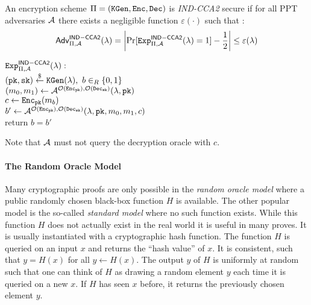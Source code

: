 \begin{definition}\label{def:indcca2}
An encryption scheme $\Pi=(\mathtt{KGen},\mathtt{Enc},\mathtt{Dec})$ is \emph{IND-CCA2} secure if for all \ac{PPT} adversaries $\mathcal{A}$ there exists a negligible function $\varepsilon(\cdot)$ such that :
\[\mathsf{Adv}_{\Pi,\mathcal{A}}^{\mathsf{IND-CCA2}}(\lambda)=\left|\Pr[\mathtt{Exp}^{\mathsf{IND-CCA2}}_{\Pi,\mathcal{A}}(\lambda)=1]-\frac12\right|\leq\varepsilon(\lambda)\]

\noindent
$\mathtt{Exp}^{\mathsf{IND-CCA2}}_{\Pi,\mathcal{A}}(\lambda):$\\
\hspace*{2em}$(\mathtt{pk},\mathtt{sk})\stackrel{\$}{\gets}\mathtt{KGen}(\lambda),~b\in_R\{0,1\}$\\
\hspace*{2em}$(m_0,m_1)\gets\mathcal{A}^{\mathcal{O}(\mathtt{Enc}_\mathtt{pk}),\mathcal{O}(\mathtt{Dec}_\mathtt{sk})}(\lambda,\mathtt{pk})$\\
\hspace*{2em}$c\gets\mathtt{Enc}_\mathtt{pk}(m_b)$\\
\hspace*{2em}$b'\gets\mathcal{A}^{\mathcal{O}(\mathtt{Enc}_\mathtt{pk}),\mathcal{O}(\mathtt{Dec}_\mathtt{sk})}(\lambda,\mathtt{pk},m_0,m_1,c)$\\
\hspace*{2em}return $b=b'$
\eod
\end{definition}

\noindent
Note that $\mathcal{A}$ must not query the decryption oracle with $c$.

\paragraph{The Random Oracle Model}
Many cryptographic proofs are only possible in the \emph{random oracle model} where a public randomly chosen black-box function $H$ is available.
The other popular model is the so-called \emph{standard model} where no such function exists.
While this function $H$ does not actually exist in the real world it is useful in many proves.
It is usually instantiated with a cryptographic hash function.
The function $H$ is queried on an input $x$ and returns the ``hash value'' of $x$.
It is consistent, such that $y=H(x)$ for all $y\gets H(x)$.
The output $y$ of $H$ is uniformly at random such that one can think of $H$ as drawing a random element $y$ each time it is queried on a new $x$.
If $H$ has seen $x$ before, it returns the previously chosen element $y$.

